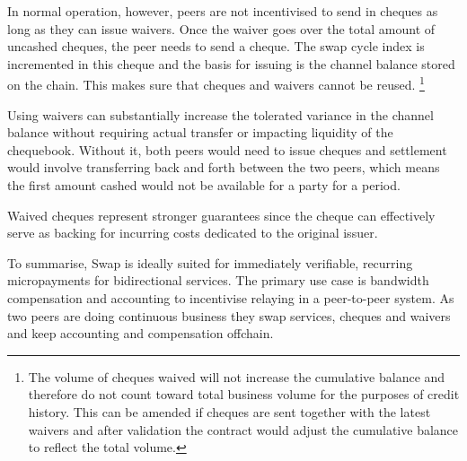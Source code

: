 In normal operation, however, peers are not incentivised to send in cheques as long as they can issue waivers. Once the waiver goes over the total amount of uncashed cheques, the peer needs to send a cheque. The swap cycle index is incremented in this cheque and the basis for issuing is the channel balance stored on the chain. This makes sure that cheques and waivers cannot be reused.%
%
\footnote{The volume of cheques waived will not increase the cumulative balance and therefore do not count toward total business volume for the purposes of credit history.
This can be amended if cheques are sent together with the latest waivers
and after validation the contract would adjust the cumulative balance to reflect the total volume.}

Using waivers can substantially increase the tolerated variance in the channel balance
without requiring actual transfer or impacting liquidity of the chequebook.
Without it, both peers would need to issue cheques and settlement would involve
transferring back and forth between the two peers, which means the first amount cashed
would not be available for a party for a period.

Waived cheques represent stronger guarantees since the cheque can effectively serve
as backing for incurring costs dedicated to the original issuer.

To summarise, Swap is ideally suited for immediately verifiable, recurring micropayments for bidirectional
services. The primary use case is bandwidth compensation and accounting to incentivise
relaying in a peer-to-peer system. As two peers are doing continuous business
they swap services, cheques and waivers and keep accounting and compensation offchain.




